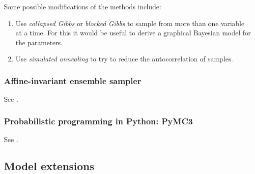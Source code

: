 \documentclass[
  a4paper,
	fontsize=11pt, %
	twoside=false, %
  secnumdepth=2,
	numbers=noenddot, %
]{kaohandt}
\begin{document}
Some possible modifications of the methods include:

\begin{enumerate}
  \item Use \textit{collapsed Gibbs} or \textit{blocked Gibbs} to sample from more than one variable at a time. For this it would be useful to derive a graphical Bayesian model for the parameters.
  \item Use \textit{simulated annealing} to try to reduce the autocorrelation of samples.

\end{enumerate}

\subsubsection{Affine-invariant ensemble sampler}

See .

\subsubsection{Probabilistic programming in Python: PyMC3}

See .

\subsection{Model extensions}
\end{document}
